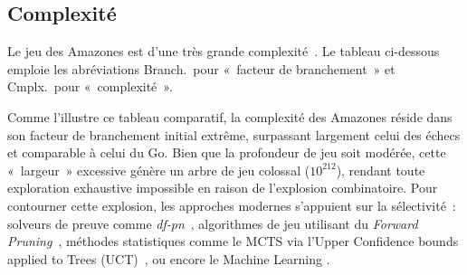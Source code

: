 \documentclass[a4paper]{article}
\begin{document}
\subsection{Complexité} \label{sec:complexite}

Le jeu des Amazones est d'une très grande complexité~\cite{Hensgens2001}.
Le tableau ci-dessous emploie les abréviations Branch.~pour «~facteur de
branchement~» et Cmplx.~pour «~complexité~».

\begin{table}[H]
    \centering
\renewcommand{\arraystretch}{1.5}
\caption{Comparaison des complexités pour des tailles de plateau traditionnelles (8$\times$8
pour les échecs, 10$\times$10 pour les Amazones, 19$\times$19 pour le Go)
\cite{Allis1994}\cite{Tromp2007}}
\end{table}
\renewcommand{\arraystretch}{1}

Comme l'illustre ce tableau comparatif, la complexité des Amazones réside
dans son facteur de branchement initial extrême, surpassant largement celui
des échecs et comparable à celui du Go. Bien que la profondeur de jeu soit
modérée, cette «~largeur~» excessive génère un arbre de jeu colossal
($10^{212}$), rendant toute exploration exhaustive impossible en raison de
l'explosion combinatoire. Pour contourner cette explosion, les approches
modernes s'appuient sur la sélectivité~: solveurs de preuve comme
\textit{df-pn}~\cite{Song2015Amazons}, algorithmes de jeu utilisant du
\textit{Forward Pruning}~\cite{Qian2015}, méthodes statistiques comme le MCTS
via l'Upper Confidence bounds applied to Trees (UCT)~\cite{Kocsis2006}, ou encore
le Machine Learning \cite{qian2026resource}.
\end{document}
